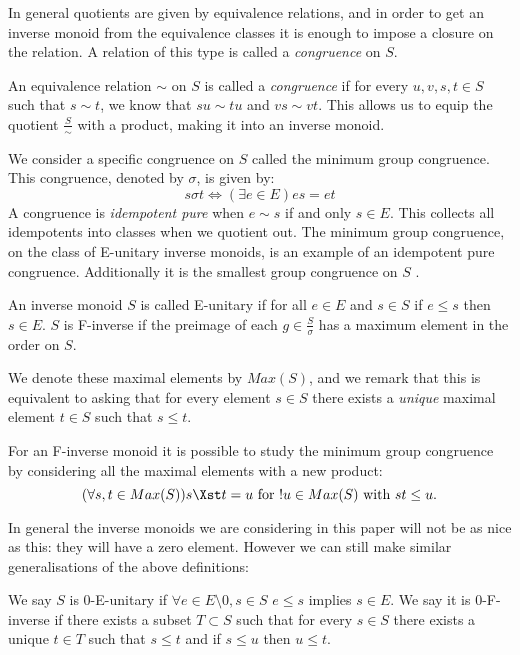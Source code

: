 In general quotients are given by equivalence relations, and in order to get an inverse monoid from the equivalence classes it is enough to impose a closure on the relation. A relation of this type is called a \textit{congruence} on $S$.

\begin{definition}
An equivalence relation $\sim$ on $S$ is called a \textit{congruence} if for every $u,v,s,t \in S$ such that $s \sim t$, we know that $su\sim tu$ and $vs \sim vt$. This allows us to equip the quotient $\frac{S}{\sim}$ with a product, making it into an inverse monoid.
\end{definition}

We consider a specific congruence on $S$ called the minimum group congruence.  This congruence, denoted by $\sigma$, is given by:
\begin{equation*}
s \sigma t \Leftrightarrow (\exists e \in E) es = et
\end{equation*}
A congruence is \textit{idempotent pure} when $e \sim s$ if and only $s \in E$. This collects all idempotents into classes when we quotient out. The minimum group congruence, on the class of E-unitary inverse monoids, is an example of an idempotent pure congruence. Additionally it is the smallest group congruence on $S$ \cite{MR1694900}.
\begin{definition}
An inverse monoid $S$ is called E-unitary if for all $e \in E$ and $s \in S$ if $e \leq s$ then $s \in E$. $S$ is F-inverse if the preimage of each $g \in \frac{S}{\sigma}$ has a maximum element in the order on $S$.
\end{definition}

We denote these maximal elements by $Max(S)$, and we remark that this is equivalent to asking that for every element $s \in S$ there exists a \textit{unique} maximal element $t \in S$ such that $s \leq t$.

For an F-inverse monoid it is possible to study the minimum group congruence by considering all the maximal elements with a new product:
\begin{equation*}
(\forall s,t \in Max(S)) s \Xst t = u \mbox{ for } !u \in Max(S) \mbox{ with } st \leq u.
\end{equation*}

In general the inverse monoids we are considering in this paper will not be as nice as this: they will have a zero element. However we can still make similar generalisations of the above definitions:

\begin{definition}
We say $S$ is 0-E-unitary if $\forall e \in E\setminus 0, s \in S$ $e \leq s$ implies $s \in E$. We say it is 0-F-inverse if there exists a subset $T \subset S$ such that for every $s \in S$ there exists a unique $t \in T$ such that $s \leq t$ and if $s \leq u$ then $u \leq t$.
\end{definition}


